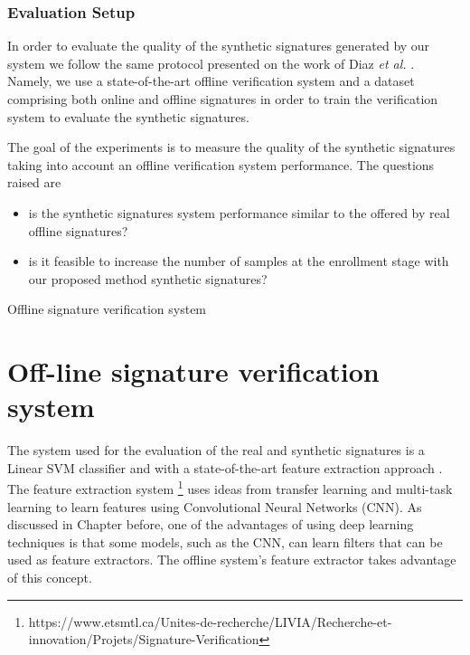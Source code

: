 \documentclass{beamer}
\begin{document}
\begin{frame}
\frametitle{Evaluation Setup}
In order to evaluate the quality of the synthetic signatures generated by our system we follow the same protocol presented on the work of Diaz \textit{et al.} \cite{diaz2014generation}. Namely, we use a state-of-the-art offline verification system and a dataset comprising both online and offline signatures in order to train the verification system to evaluate the synthetic signatures.

The goal of the experiments is to measure the quality of the synthetic signatures taking into account an offline verification system performance. The questions raised are 

\begin{itemize}
  \item is the synthetic signatures system performance similar to the offered by real offline signatures?
  \item is it feasible to increase the number of samples at the enrollment stage with our proposed method synthetic signatures? 
\end{itemize}
\end{frame}

\begin{frame}{Offline signature verification system}
\section{Off-line signature verification system}
The system used for the evaluation of the real and synthetic signatures is a Linear SVM classifier and with a state-of-the-art feature extraction approach  \cite{hafemann2017learning}. The feature extraction system \footnote{https://www.etsmtl.ca/Unites-de-recherche/LIVIA/Recherche-et-innovation/Projets/Signature-Verification} uses ideas from transfer learning and multi-task learning to learn features using Convolutional Neural Networks (CNN). As discussed in Chapter before, one of the advantages of using deep learning techniques is that some models, such as the CNN, can learn filters that can be used as feature extractors. The offline system's feature extractor takes advantage of this concept.
\end{frame}
\end{document}
